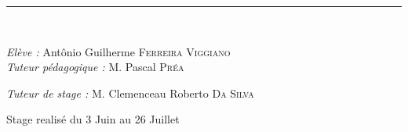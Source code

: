 \begin{titlepage}
\begin{center}
\hrule  ~\\[1.5cm]


\end{center}



\large\emph{Elève :} \hfill Antônio Guilherme \textsc{Ferreira Viggiano} ~\\

\large\emph{Tuteur pédagogique :} \hfill M. Pascal \textsc{Préa}

\large\emph{Tuteur de stage :} \hfill M. Clemenceau Roberto \textsc{Da Silva}

\vfill

\begin{center}
  \large Stage realisé du 3 Juin au 26 Juillet
\end{center}






\end{titlepage}
